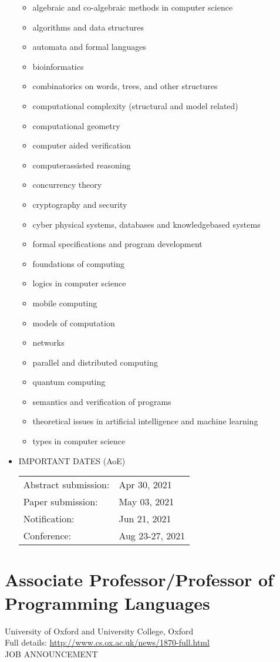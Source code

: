 \documentclass{article}
\begin{document}
\begin{itemize}
\begin{itemize}\item  algebraic and co-algebraic methods in computer science
\item  algorithms and data structures
\item  automata and formal languages
\item  bioinformatics 
\item  combinatorics on words, trees, and other structures 
\item  computational complexity (structural and model related) 
\item  computational geometry 
\item  computer aided verification 
\item  computerassisted reasoning 
\item  concurrency theory 
\item  cryptography and security 
\item  cyber physical systems, databases and knowledgebased systems 
\item  formal specifications and program development 
\item  foundations of computing 
\item  logics in computer science 
\item  mobile computing 
\item  models of computation 
\item  networks 
\item  parallel and distributed computing 
\item  quantum computing 
\item  semantics and verification of programs 
\item  theoretical issues in artificial intelligence and machine learning 
\item  types in computer science
\end{itemize} 
\item  IMPORTANT DATES (AoE) 
 
\begin{tabulary}{\linewidth}{LL}Abstract submission:  & Apr 30, 2021 \\
Paper submission:  & May 03, 2021 \\
Notification:  & Jun 21, 2021 \\
Conference:  & Aug 23-27, 2021 \\
\end{tabulary}
 
\end{itemize}\section{Associate Professor/Professor of Programming Languages}\label{AssociateProfessorProfessorofProgrammingLanguages}  University of Oxford and University College, Oxford\\ 
  Full details: \href{http://www.cs.ox.ac.uk/news/1870-full.html}{http://www.cs.ox.ac.uk/news/1870-full.html}\\ 
JOB ANNOUNCEMENT 
\end{document}
